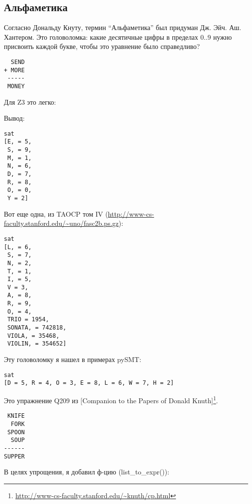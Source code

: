 \subsection{Альфаметика}

Согласно Дональду Кнуту, термин ``Альфаметика'' был придуман Дж. Эйч. Аш. Хантером.
Это головоломка: какие десятичные цифры в пределах 0..9 нужно присвоить каждой букве, чтобы это уравнение было справедливо?

\begin{lstlisting}
  SEND
+ MORE
 -----
 MONEY
\end{lstlisting}

Для Z3 это легко:



Вывод:

\begin{lstlisting}
sat
[E, = 5,
 S, = 9,
 M, = 1,
 N, = 6,
 D, = 7,
 R, = 8,
 O, = 0,
 Y = 2]
\end{lstlisting}

Вот еще одна, из \ac{TAOCP} том IV (\url{http://www-cs-faculty.stanford.edu/~uno/fasc2b.ps.gz}):



\begin{lstlisting}
sat
[L, = 6,
 S, = 7,
 N, = 2,
 T, = 1,
 I, = 5,
 V = 3,
 A, = 8,
 R, = 9,
 O, = 4,
 TRIO = 1954,
 SONATA, = 742818,
 VIOLA, = 35468,
 VIOLIN, = 354652]
\end{lstlisting}

Эту головоломку я нашел в примерах pySMT:



\begin{lstlisting}
sat
[D = 5, R = 4, O = 3, E = 8, L = 6, W = 7, H = 2]
\end{lstlisting}


Это упражнение Q209 из
[Companion to the Papers of Donald Knuth]\footnote{\url{http://www-cs-faculty.stanford.edu/~knuth/cp.html}}.

\begin{lstlisting}
 KNIFE
  FORK
 SPOON
  SOUP
------
SUPPER
\end{lstlisting}

В целях упрощения, я добавил ф-цию (list\_to\_expr()):



